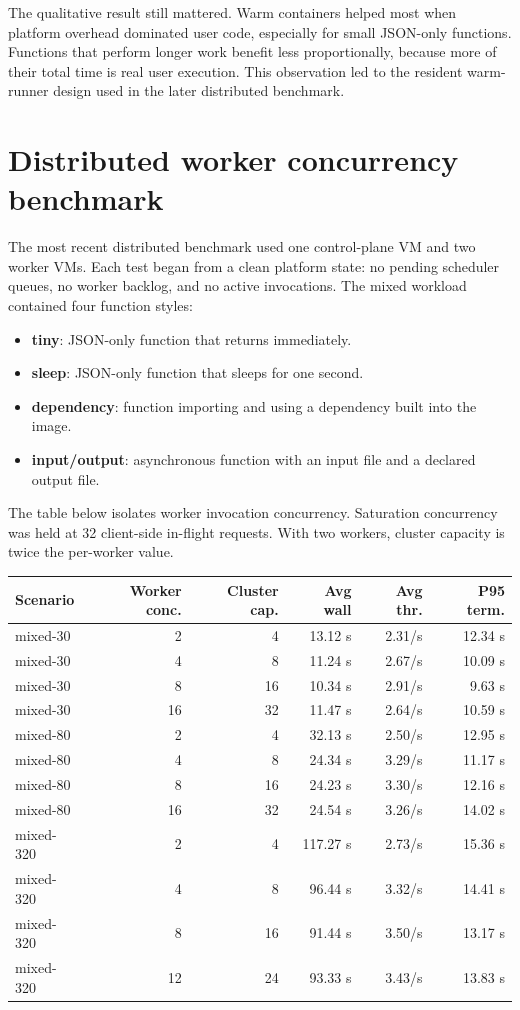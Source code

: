 \documentclass[12pt,a4paper]{report}
\begin{document}
The qualitative result still mattered. Warm containers helped most when
platform overhead dominated user code, especially for small JSON-only
functions. Functions that perform longer work benefit less proportionally,
because more of their total time is real user execution. This observation led
to the resident warm-runner design used in the later distributed benchmark.

\section{Distributed worker concurrency benchmark}

The most recent distributed benchmark used one control-plane VM and two worker
VMs. Each test began from a clean platform state: no pending scheduler queues,
no worker backlog, and no active invocations. The mixed workload contained four
function styles:

\begin{itemize}[leftmargin=1.2cm]
  \item \textbf{tiny}: JSON-only function that returns immediately.
  \item \textbf{sleep}: JSON-only function that sleeps for one second.
  \item \textbf{dependency}: function importing and using a dependency built into the image.
  \item \textbf{input/output}: asynchronous function with an input file and a declared output file.
\end{itemize}

The table below isolates worker invocation concurrency. Saturation concurrency
was held at 32 client-side in-flight requests. With two workers, cluster
capacity is twice the per-worker value.

\begin{longtable}{p{}rrrrr}
\toprule
\textbf{Scenario} & \textbf{Worker conc.} & \textbf{Cluster cap.} & \textbf{Avg wall} & \textbf{Avg thr.} & \textbf{P95 term.} \\
\midrule
mixed-30 & 2 & 4 & 13.12 s & 2.31/s & 12.34 s \\
mixed-30 & 4 & 8 & 11.24 s & 2.67/s & 10.09 s \\
mixed-30 & 8 & 16 & 10.34 s & 2.91/s & 9.63 s \\
mixed-30 & 16 & 32 & 11.47 s & 2.64/s & 10.59 s \\
\midrule
mixed-80 & 2 & 4 & 32.13 s & 2.50/s & 12.95 s \\
mixed-80 & 4 & 8 & 24.34 s & 3.29/s & 11.17 s \\
mixed-80 & 8 & 16 & 24.23 s & 3.30/s & 12.16 s \\
mixed-80 & 16 & 32 & 24.54 s & 3.26/s & 14.02 s \\
\midrule
mixed-320 & 2 & 4 & 117.27 s & 2.73/s & 15.36 s \\
mixed-320 & 4 & 8 & 96.44 s & 3.32/s & 14.41 s \\
mixed-320 & 8 & 16 & 91.44 s & 3.50/s & 13.17 s \\
mixed-320 & 12 & 24 & 93.33 s & 3.43/s & 13.83 s \\
\bottomrule
\end{longtable}
\end{document}
